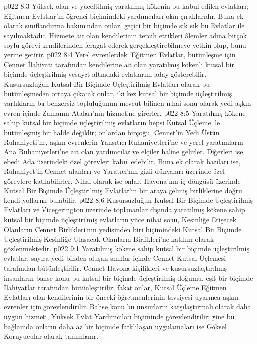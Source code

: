 \vs p022 8:3 Yüksek olan ve yüceltilmiş yaratılmış kökenin bu kabul edilen evlatları; Eğitmen Evlatlar’ın öğrenci biçimindeki yardımcıları olan çıraklarıdır. Buna ek olarak sınıflandırma bakımından onlar, geçici bir biçimde sık sık bu Evlatlar ile sayılmaktadır. Hizmete ait olan kendilerinin tercih ettikleri âlemler adına birçok soylu görevi kendilerinden feragat ederek gerçekleştirebilmeye yetkin olup, bunu yerine getirir.
\vs p022 8:4 Yerel evrenlerdeki Eğitmen Evlatlar, bütünleşme için Cennet İlahiyatı tarafından kendilerine ait olan yaratılmış kökenli kutsal bir biçimde üçleştirilmiş vesayet altındaki evlatlarını aday gösterebilir. Kusursuzluğun Kutsal Bir Biçimde Üçleştirilmiş Evlatları olarak bu bütünleşmeden ortaya çıkarak onlar, iki kez kutsal bir biçimde üçleştirilmiş varlıkların bu benzersiz topluluğunun mevcut bilinen nihai sonu olarak yedi aşkın evren içinde Zamanın Ataları’nın hizmetine girerler.
\vs p022 8:5 Yaratılmış kökene sahip kutsal bir biçimde üçleştirilmiş evlatların hepsi Kutsal Üçleme ile bütünleşmiş bir halde değildir; onlardan birçoğu, Cennet’in Yedi Üstün Ruhaniyeti’ne, aşkın evrenlerin Yansıtıcı Ruhaniyetleri’ne ve yerel yaratımların Ana Ruhaniyetleri’ne ait olan yardımcılar ve elçiler haline gelirler. Diğerleri ise ebedi Ada üzerindeki özel görevleri kabul edebilir. Buna ek olarak bazıları ise, Ruhaniyet’in Cennet alanları ve Yaratıcı’nın gizli dünyaları üzerinde özel görevlere katılabilirler. Nihai olarak ise onlar, Havona’nın iç döngüsü üzerinde Kutsal Bir Biçimde Üçleştirilmiş Evlatlar’ın bir araya gelmiş birliklerine doğru kendi yollarını bulabilir.
\vs p022 8:6 Kusursuzluğun Kutsal Bir Biçimde Üçleştirilmiş Evlatları ve Vicegerington üzerinde toplananlar dışında yaratılmış kökene sahip kutsal bir biçimde üçleştirilmiş evlatların yüce nihai sonu, Kesinliğe Erişecek Olanların Cennet Birlikleri’nin yedisinden biri biçimindeki Kutsal Bir Biçimde Üçleştirilmiş Kesinliğe Ulaşacak Olanların Birlikleri’ne katılım olarak gözlenmektedir.
\vs p022 9:1 Yaratılmış kökene sahip kutsal bir biçimde üçleştirilmiş evlatlar, sayıca yedi binden oluşan sınıflar içinde Cennet Kutsal Üçlemesi tarafından bütünleştirilir. Cennet\hyp{}Havona kişilikleri ve kusursuzlaştırılmış insanların bahse konu bu kutsal bir biçimde üçleştirilmiş doğumu, eşit bir biçimde İlahiyatlar tarafından bütünleştirilir; fakat onlar, Kutsal Üçleme Eğitmen Evlatları olan kendilerinin bir önceki öğretmenlerinin tavsiyesi uyarınca aşkın evrenler için görevlendirilir. Bahse konu bu unsurların karşılaştırmalı olarak daha uygun hizmeti, Yüksek Evlat Yardımcıları biçiminde görevlendirilir; yine bu bağlamda onların daha az bir biçimde farklılaşan uygulamaları ise Göksel Koruyucular olarak tanımlanır.
